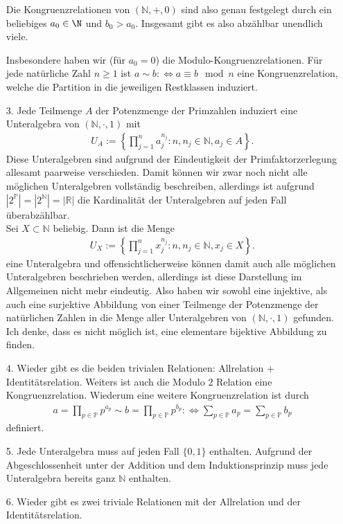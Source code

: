 \begin{solution}
\begin{itemize}
Die Kongruenzrelationen von $(\mathbb{N},+,0)$ sind also genau festgelegt durch ein beliebiges $a_0 \in \N$ und $b_0 > a_0$. Insgesamt gibt es also abzählbar unendlich viele.

Insbesondere haben wir (für $a_0 = 0$) die Modulo-Kongruenzrelationen. Für jede natürliche Zahl
$n \geq 1$ ist $a \sim b: \iff a \equiv b \mod n$ eine Kongruenzrelation, welche
die Partition in die jeweiligen Restklassen induziert.
\item [3.] Jede Teilmenge $A$ der Potenzmenge der Primzahlen induziert eine
Unteralgebra von $(\mathbb{N},\cdot,1)$ mit
\begin{align*}
  U_A := \left\{\prod_{j=1}^na_j^{n_j}: n, n_j \in \mathbb{N}, a_j \in A\right\}.
\end{align*}
Diese Unteralgebren sind aufgrund der Eindeutigkeit
der Primfaktorzerlegung allesamt paarweise verschieden.
Damit können wir zwar noch nicht alle möglichen Unteralgebren
vollständig beschreiben, allerdings ist aufgrund $|2^\mathbb{P}| = |2^\mathbb{N}|
= |\mathbb{R}|$ die Kardinalität der Unteralgebren auf jeden
Fall überabzählbar. \\
Sei $X \subset \mathbb{N}$ beliebig.
Dann ist die Menge
\begin{align*}
  U_X := \left\{\prod_{j=1}^nx_j^{n_j}: n, n_j \in \mathbb{N}, x_j \in X\right\}.
\end{align*}
eine Unteralgebra und offensichtlicherweise können damit auch alle möglichen
Unteralgebren beschrieben werden, allerdings ist diese Darstellung im Allgemeinen
nicht mehr eindeutig.
Also haben wir sowohl eine injektive, als auch eine surjektive Abbildung von
einer Teilmenge der Potenzmenge der natürlichen Zahlen in die Menge aller
Unteralgebren von $(\mathbb{N},\cdot,1)$ gefunden. \\
Ich denke, dass es nicht möglich ist, eine elementare bijektive Abbildung zu finden.
\item [4.] Wieder gibt es die beiden trivialen Relationen: Allrelation + Identitätsrelation.
Weiters ist auch die Modulo 2 Relation eine Kongruenzrelation.
Wiederum eine weitere Kongruenzrelation ist durch
\begin{align*}
  a = \prod_{p \in \mathbb{P}}p^{a_p} \sim b = \prod_{p \in \mathbb{P}}p^{b_p}: \iff \sum_{p \in \mathbb{P}} a_p = \sum_{p \in \mathbb{P}} b_p
\end{align*}
definiert.
\item [5.] Jede Unteralgebra muss auf jeden Fall $\{0,1\}$ enthalten. Aufgrund
der Abgeschlossenheit unter der Addition und dem Induktionsprinzip
muss jede Unteralgebra bereits ganz $\mathbb{N}$ enthalten.
\item [6.] Wieder gibt es zwei triviale Relationen mit der Allrelation und der
Identitätsrelation.


\end{itemize}
\end{solution}
